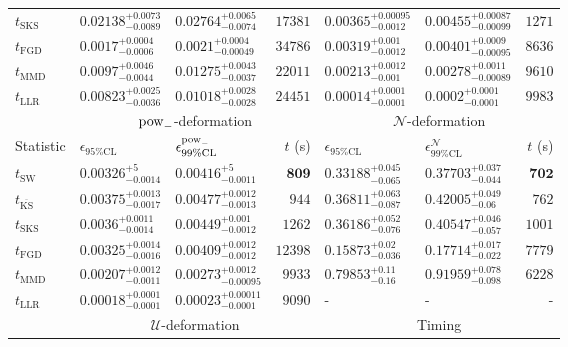 \begin{tabular}{l|llr|llr}
	$t_{\mathrm{SKS}}$ & $0.02138_{-0.0089}^{+0.0073}$ & $0.02764_{-0.0074}^{+0.0065}$ & $17381$ & $0.00365_{-0.0012}^{+0.00095}$ & $0.00455_{-0.00099}^{+0.00087}$ & $1271$ \\
	$t_{\mathrm{FGD}}$ & ${\mathbf{0.0017_{-0.0006}^{+0.0004}}}$ & ${\mathbf{0.0021_{-0.00049}^{+0.0004}}}$ & $34786$ & $0.00319_{-0.0012}^{+0.001}$ & $0.00401_{-0.00095}^{+0.0009}$ & $8636$ \\
	$t_{\mathrm{MMD}}$ & $0.0097_{-0.0044}^{+0.0046}$ & $0.01275_{-0.0037}^{+0.0043}$ & $22011$ & ${\mathbf{0.00213_{-0.001}^{+0.0012}}}$ & ${\mathbf{0.00278_{-0.00089}^{+0.0011}}}$ & $9610$ \\
	$t_{\mathrm{LLR}}$ & $0.00823_{-0.0036}^{+0.0025}$ & $0.01018_{-0.0028}^{+0.0028}$ & $24451$ & $0.00014_{-0.0001}^{+0.0001}$ & $0.0002_{-0.0001}^{+0.0001}$ & $9983$ \\
	\toprule
	\multicolumn{1}{c}{} & \multicolumn{3}{c}{$\rm{pow}_{-}$-deformation} & \multicolumn{3}{c}{$\mathcal{N}$-deformation} \\
	Statistic & $\epsilon_{95\%\mathrm{CL}}$ & $\epsilon^  {\rm{pow}_{-}}_{99\%\mathrm{CL}}$ & $t$ (s) & $\epsilon_{95\%\mathrm{CL}}$ & $\epsilon^    {\mathcal{N}}_{99\%\mathrm{CL}}$ & $t$ (s) \\
	\midrule
	$t_{\mathrm{SW}}$ & $0.00326_{-0.0014}^{+5}$ & $0.00416_{-0.0011}^{+5}$ & ${\mathbf{809}}$ & $0.33188_{-0.065}^{+0.045}$ & $0.37703_{-0.044}^{+0.037}$ & ${\mathbf{702}}$ \\
	$t_{\overline{\mathrm{KS}}}$ & $0.00375_{-0.0017}^{+0.0013}$ & $0.00477_{-0.0013}^{+0.0012}$ & $944$ & $0.36811_{-0.087}^{+0.063}$ & $0.42005_{-0.06}^{+0.049}$ & $762$ \\
	$t_{\mathrm{SKS}}$ & $0.0036_{-0.0014}^{+0.0011}$ & $0.00449_{-0.0012}^{+0.001}$ & $1262$ & $0.36186_{-0.076}^{+0.052}$ & $0.40547_{-0.057}^{+0.046}$ & $1001$ \\
	$t_{\mathrm{FGD}}$ & $0.00325_{-0.0016}^{+0.0014}$ & $0.00409_{-0.0012}^{+0.0012}$ & $12398$ & ${\mathbf{0.15873_{-0.036}^{+0.02}}}$ & ${\mathbf{0.17714_{-0.022}^{+0.017}}}$ & $7779$ \\
	$t_{\mathrm{MMD}}$ & ${\mathbf{0.00207_{-0.0011}^{+0.0012}}}$ & ${\mathbf{0.00273_{-0.00095}^{+0.0012}}}$ & $9933$ & $0.79853_{-0.16}^{+0.11}$ & $0.91959_{-0.098}^{+0.078}$ & $6228$ \\
	$t_{\mathrm{LLR}}$ & $0.00018_{-0.0001}^{+0.0001}$ & $0.00023_{-0.0001}^{+0.00011}$ & $9090$ & - & - & - \\
	\toprule
	\multicolumn{1}{c}{} & \multicolumn{3}{c}{$\mathcal{U}$-deformation} & \multicolumn{3}{c}{Timing} \\

\end{tabular}

